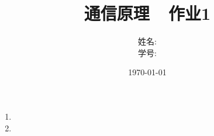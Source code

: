 

\title{\heiti {} 通信原理\ \ 作业1}
\author{姓名: \\学号: }
\date{\today}



\cfoot{\thepage}
\maketitle

\begin{enumerate}
  \item 
  \item 
\end{enumerate}


